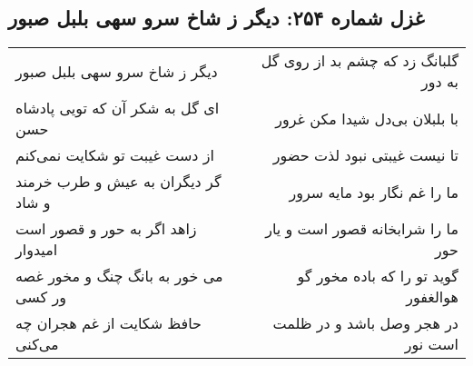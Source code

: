 \begin{center}
\section*{غزل شماره ۲۵۴: دیگر ز شاخ سرو سهی بلبل صبور}
\label{sec:sh254}
\begin{longtable}{l p{0.5cm} r}
دیگر ز شاخ سرو سهی بلبل صبور
&&
گلبانگ زد که چشم بد از روی گل به دور
\\
ای گل به شکر آن که تویی پادشاه حسن
&&
با بلبلان بی‌دل شیدا مکن غرور
\\
از دست غیبت تو شکایت نمی‌کنم
&&
تا نیست غیبتی نبود لذت حضور
\\
گر دیگران به عیش و طرب خرمند و شاد
&&
ما را غم نگار بود مایه سرور
\\
زاهد اگر به حور و قصور است امیدوار
&&
ما را شرابخانه قصور است و یار حور
\\
می خور به بانگ چنگ و مخور غصه ور کسی
&&
گوید تو را که باده مخور گو هوالغفور
\\
حافظ شکایت از غم هجران چه می‌کنی
&&
در هجر وصل باشد و در ظلمت است نور
\\
\end{longtable}
\end{center}
